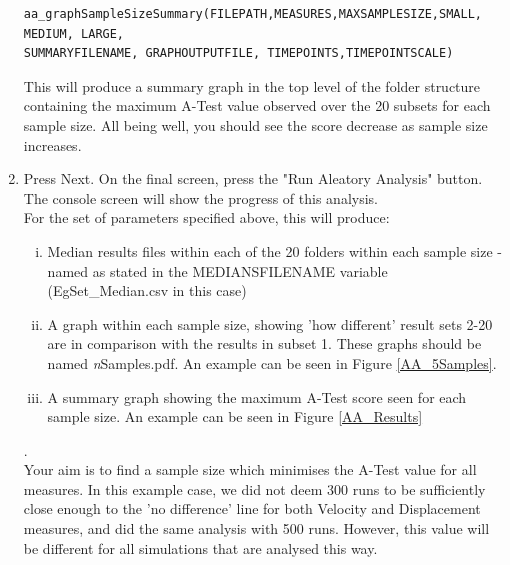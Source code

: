 \documentclass[a4paper,11pt]{article}
\begin{document}
\begin{enumerate}
\begin{verbatim}
aa_graphSampleSizeSummary(FILEPATH,MEASURES,MAXSAMPLESIZE,SMALL, MEDIUM, LARGE, 
SUMMARYFILENAME, GRAPHOUTPUTFILE, TIMEPOINTS,TIMEPOINTSCALE)
\end{verbatim}

This will produce a summary graph in the top level of the folder structure containing the maximum A-Test value observed over the 20 subsets for each sample size. All being well, you should see the score decrease as sample size increases.  \\

\item Press Next. On the final screen, press the "Run Aleatory Analysis" button. The console screen will show the progress of this analysis.
\\
For the set of parameters specified above, this will produce:
\begin{enumerate}[(i)]
\item Median results files within each of the 20 folders within each sample size - named as stated in the MEDIANSFILENAME variable (EgSet\_Median.csv in this case)
\item A graph within each sample size, showing 'how different' result sets 2-20 are in comparison with the results in subset 1.  These graphs should be named \textit{n}Samples.pdf. An example can be seen in Figure \ref{AA_5Samples}.
\item A summary graph showing the maximum A-Test score seen for each sample size. An example can be seen in Figure \ref{AA_Results}
\end{enumerate}. 
\\

Your aim is to find a sample size which minimises the A-Test value for all measures.  In this example case, we did not deem 300 runs to be sufficiently close enough to the 'no difference' line for both Velocity and Displacement measures, and did the same analysis with 500 runs.  However, this value will be different for all simulations that are analysed this way.


\end{enumerate}
\newpage 
\end{document}
